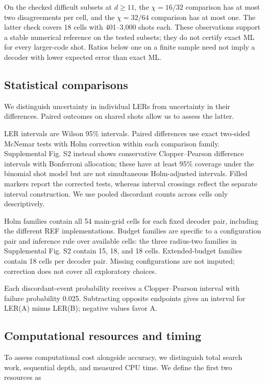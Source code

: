 \documentclass[aps,prapplied,reprint,superscriptaddress,amsmath,amssymb,floatfix,nofootinbib]{revtex4-2}
\begin{document}
On the checked difficult subsets at \(d\ge11\), the \(\chi=16/32\)
comparison has at most two disagreements per cell, and the
\(\chi=32/64\) comparison has at most one. The latter check covers 18
cells with 401--3,000 shots each. These observations support a stable
numerical reference on the tested subsets; they do not certify exact ML
for every larger-code shot. Ratios below one on a finite sample need not
imply a decoder with lower expected error than exact ML.

\subsection{Statistical
comparisons}\label{c.-statistical-comparisons}

We distinguish uncertainty in individual LERs from uncertainty in their
differences. Paired outcomes on shared shots allow us to assess the
latter.

LER intervals are Wilson 95\% intervals. Paired differences use exact
two-sided McNemar tests with Holm correction within each comparison
family. Supplemental Fig. S2 instead shows conservative Clopper--Pearson
difference intervals with Bonferroni allocation; these have at least
95\% coverage under the binomial shot model but are not simultaneous
Holm-adjusted intervals. Filled markers report the corrected tests,
whereas interval crossings reflect the separate interval construction.
We use pooled discordant counts across cells only descriptively.

Holm families contain all 54 main-grid cells for each fixed decoder
pair, including the different REF implementations. Budget families are
specific to a configuration pair and inference rule over available
cells: the three radius-two families in Supplemental Fig. S2 contain 15,
18, and 18 cells. Extended-budget families contain 18 cells per decoder
pair. Missing configurations are not imputed; correction does not cover
all exploratory choices.

Each discordant-event probability receives a Clopper--Pearson interval
with failure probability 0.025. Subtracting opposite endpoints gives an
interval for LER(A) minus LER(B); negative values favor A.

\subsection{Computational resources and
timing}\label{d.-computational-resources-and-timing}

To assess computational cost alongside accuracy, we distinguish total
search work, sequential depth, and measured CPU time. We define the
first two resources as
\end{document}
